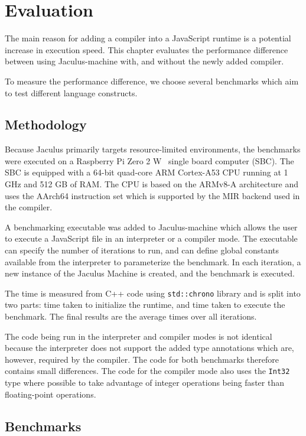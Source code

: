 \chapter{Evaluation}

The main reason for adding a compiler into a JavaScript runtime is a potential increase in execution speed. This chapter evaluates the performance difference between using Jaculus-machine with, and without the newly added compiler.

To measure the performance difference, we choose several benchmarks which aim to test different language constructs.

\section{Methodology}

Because Jaculus primarily targets resource-limited environments, the benchmarks were executed on a Raspberry Pi Zero 2 W~\cite{rpi0_datasheet} single board computer (SBC). The SBC is equipped with a 64-bit quad-core ARM Cortex-A53 CPU running at 1 GHz and 512 GB of RAM. The CPU is based on the ARMv8-A architecture and uses the AArch64 instruction set which is supported by the MIR backend used in the compiler.

A benchmarking executable was added to Jaculus-machine which allows the user to execute a JavaScript file in an interpreter or a compiler mode. The executable can specify the number of iterations to run, and can define global constants available from the interpreter to parameterize the benchmark. In each iteration, a new instance of the Jaculus Machine is created, and the benchmark is executed.

The time is measured from C++ code using \texttt{std::chrono} library and is split into two parts: time taken to initialize the runtime, and time taken to execute the benchmark. The final results are the average times over all iterations.

The code being run in the interpreter and compiler modes is not identical because the interpreter does not support the added type annotations which are, however, required by the compiler. The code for both benchmarks therefore contains small differences. The code for the compiler mode also uses the \texttt{Int32} type where possible to take advantage of integer operations being faster than floating-point operations.


\section{Benchmarks}

